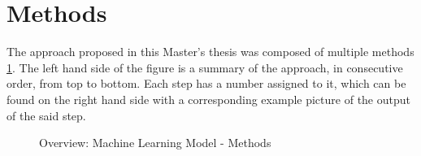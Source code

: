 \section{Methods}	

The approach proposed in this Master's thesis was composed of multiple methods \ref{fig:MachineLearningModelMethods}. The left hand side of the figure is a summary of the approach, in consecutive order, from top to bottom. Each step has a number assigned to it, which can be found on the right hand side with a corresponding example picture of the output of the said step.

\begin{figure}[H]
  \begin{center}
  \caption{Overview: Machine Learning Model - Methods}
  \label{fig:MachineLearningModelMethods}
  \end{center}
\end{figure}


